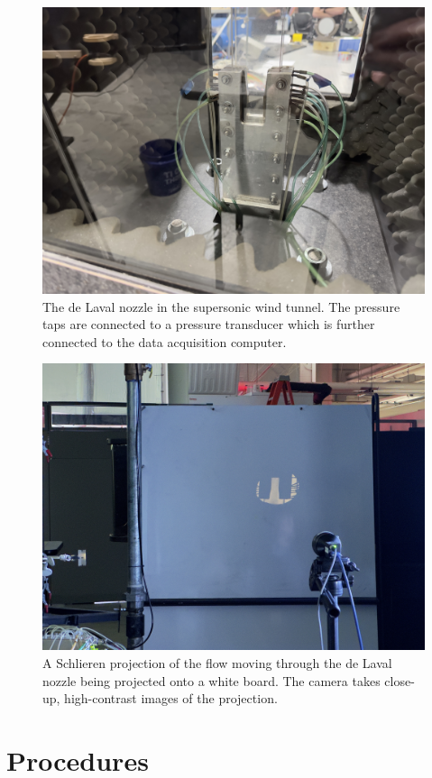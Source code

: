 \begin{figure}[htpb]
    \centering
    \includegraphics[width=0.75\linewidth]{Figures/de_laval_nozzle.jpeg}
    \caption[The de Laval nozzle in the supersonic wind tunnel.]{The de Laval nozzle in the supersonic wind tunnel. The pressure taps are connected to a pressure transducer which is further connected to the data acquisition computer.}
    \label{fig:de_laval_nozzle}
\end{figure}

\begin{figure}[htpb]
    \centering
    \includegraphics[width=0.75\linewidth]{Figures/schlieren_nozzle.jpeg}
    \caption[A Schlieren projection of the flow moving through the de Laval nozzle being projected onto a white board.]{A Schlieren projection of the flow moving through the de Laval nozzle being projected onto a white board. The camera takes close-up, high-contrast images of the projection.}
    \label{fig:schlieren_projection}
\end{figure}

\section{Procedures} \label{sec:procedures}



